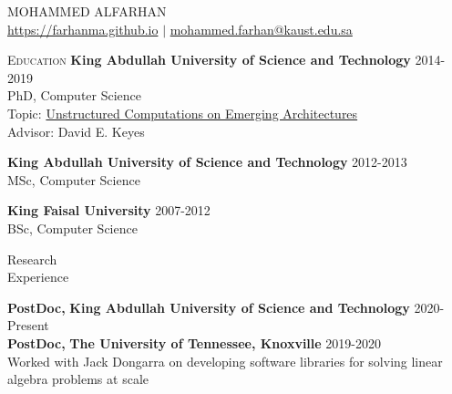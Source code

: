 \documentclass[10pt,a4paper]{article}
\begin{document}
\begin{cv}{{\LARGE MOHAMMED ALFARHAN}\\[1mm]
\href{https://farhanma.github.io}{\normalsize https://farhanma.github.io} $\vert$
\href{mailto:mohammed.farhan@kaust.edu.sa}
{\normalsize mohammed.farhan@kaust.edu.sa}}

\begin{cvlist}{}
{ %
  \vspace{+2mm}
  \item[\textsc{Education}]
  {\bf King Abdullah University of Science and Technology} \hfill 2014-2019\\
  PhD, Computer Science\\
  Topic: \href{https://repository.kaust.edu.sa/handle/10754/644902}
  {Unstructured Computations on Emerging Architectures}\\
  Advisor: {David E. Keyes}

  \vspace{+2mm}
  {\bf King Abdullah University of Science and Technology} \hfill 2012-2013\\
  MSc, Computer Science

  \vspace{+2mm}
  {\bf King Faisal University} \hfill 2007-2012\\
  BSc, Computer Science
}

\vspace{+2mm}
\item[{\parbox[t][0pt][t]{1in}{{\sc Research}\\ {\sc Experience}}}]
{\bf PostDoc,}
{\bf King Abdullah University of Science and Technology} \hfill 2020-Present\\

\vspace{+2mm}
{\bf PostDoc,}
{\bf The University of Tennessee, Knoxville} \hfill 2019-2020\\
Worked with Jack Dongarra on developing software libraries for solving linear
algebra problems at scale


\end{cvlist}
\end{cv}
\end{document}
